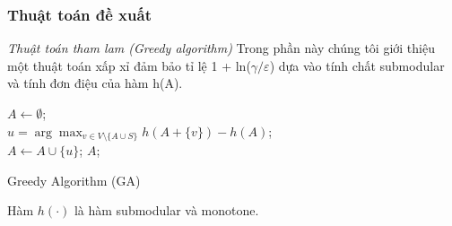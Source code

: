 \subsubsection{Thuật toán đề xuất}
{\itshape Thuật toán tham lam (Greedy algorithm)}
Trong phần này chúng tôi giới thiệu một thuật toán xấp xỉ đảm bảo tỉ lệ 1 + ln($\gamma / \varepsilon$) dựa vào tính chất submodular và tính đơn điệu của hàm h(A). 		
\\
\begin{algorithm}[tbh]			
	$A \leftarrow \emptyset$;
	\\
	{ 	
		$u=\arg \max_{v \in V\setminus \{A \cup S\}} {h(A+ \{v\})- h(A)}$; 
		\\
		$A \leftarrow A \cup \{u\}$;
	}
	\Return $A$;
	\caption{Greedy Algorithm (GA)}
	\label{GA}
\end{algorithm}

\begin{theo}					
	Hàm $h(\cdot)$ là hàm submodular và monotone. 
	\label{sub}
\end{theo}	

